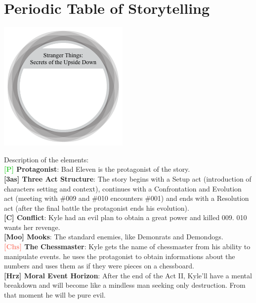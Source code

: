 
\section{Periodic Table of Storytelling }


\begin{center}

	\includegraphics[width=0.5\linewidth]{images/story_molecolar.png}

\end{center}

Description of the elements:\\
\textbf{\textcolor{LimeGreen}{[P]} Protagonist}: Bad Eleven is the protagonist of the story.\\
\textbf{\textcolor{dark-gray}{[3as]} Three Act Structure}: The story begins with a Setup act (introduction of characters setting and context), continues with a Confrontation and Evolution act (meeting with \#009 and \#010 encounters \#001) and ends with a Resolution act (after the final battle the protagonist ends his evolution).\\
\textbf{\textcolor{dark-gray}{[C]} Conflict}: Kyle had an evil plan to obtain a great power and killed 009. 010 wants her revenge.\\
\textbf{\textcolor{OliveGreen}{[Moo]} Mooks}: The standard enemies, like Demonrats and Demondogs.\\
\textbf{\textcolor{Salmon}{[Chs]} The Chessmaster}: Kyle gets the name of chessmaster from his ability to manipulate events. he uses the protagonist to obtain informations about the numbers and uses them as if they were pieces on a chessboard.\\
\textbf{\textcolor{light-gray}{[Hrz]} Moral Event Horizon}: After the end of the Act II, Kyle'll have a mental breakdown and will become like a mindless man seeking only destruction. From that moment he will be pure evil.\\